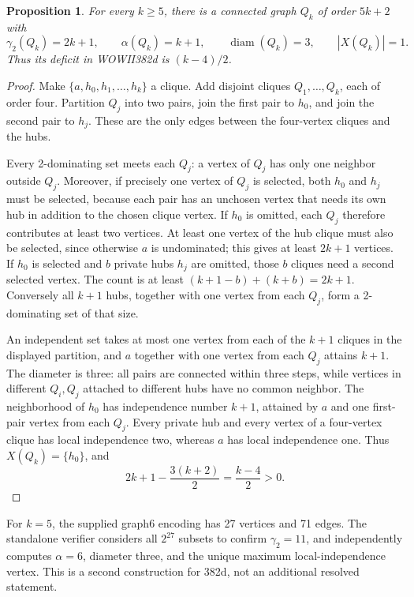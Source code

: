 \documentclass[11pt,a4paper]{article}
\newtheorem{proposition}[theorem]{Proposition}
\theoremstyle{remark}
\begin{document}
\begin{proposition}\label{r7:family382d}
For every $k\ge5$, there is a connected graph $Q_k$ of order $5k+2$
with
\[
 \gamma_2(Q_k)=2k+1,\qquad \alpha(Q_k)=k+1,
 \qquad \operatorname{diam}(Q_k)=3,
 \qquad |X(Q_k)|=1.
\]
Thus its deficit in WOWII382d is $(k-4)/2$.
\end{proposition}
\begin{proof}
Make $\{a,h_0,h_1,\ldots,h_k\}$ a clique. Add disjoint cliques
$Q_1,\ldots,Q_k$, each of order four. Partition $Q_j$ into two
pairs, join the first pair to $h_0$, and join the second pair to
$h_j$. These are the only edges between the four-vertex cliques
and the hubs.

Every 2-dominating set meets each $Q_j$: a vertex of $Q_j$ has only
one neighbor outside $Q_j$. Moreover, if precisely one vertex of
$Q_j$ is selected, both $h_0$ and $h_j$ must be selected, because
each pair has an unchosen vertex that needs its own hub in addition
to the chosen clique vertex. If $h_0$ is omitted, each $Q_j$
therefore contributes at least two vertices. At least one vertex
of the hub clique must also be selected, since otherwise $a$ is
undominated; this gives at least $2k+1$ vertices. If $h_0$ is
selected and $b$ private hubs $h_j$ are omitted, those $b$ cliques
need a second selected vertex. The count is at least
$(k+1-b)+(k+b)=2k+1$. Conversely all $k+1$ hubs, together with one
vertex from each $Q_j$, form a 2-dominating set of that size.

An independent set takes at most one vertex from each of the
$k+1$ cliques in the displayed partition, and $a$ together with
one vertex from each $Q_j$ attains $k+1$. The diameter is three:
all pairs are connected within three steps, while vertices in
different $Q_i,Q_j$ attached to different hubs have no common
neighbor. The neighborhood of $h_0$ has independence number
$k+1$, attained by $a$ and one first-pair vertex from each $Q_j$.
Every private hub and every vertex of a four-vertex clique has
local independence two, whereas $a$ has local independence one.
Thus $X(Q_k)=\{h_0\}$, and
\[
 2k+1-\frac{3(k+2)}2=\frac{k-4}{2}>0.
\]
\end{proof}

For $k=5$, the supplied graph6 encoding has 27 vertices and 71 edges.
The standalone verifier considers all $2^{27}$ subsets to confirm
$\gamma_2=11$, and independently computes $\alpha=6$, diameter three,
and the unique maximum local-independence vertex. This is a second
construction for 382d, not an additional resolved statement.
\end{document}

